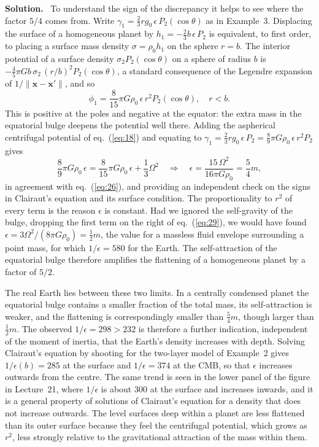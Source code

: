 \documentclass[a4paper,12pt]{paper}
\newenvironment{solution}{\par\noindent\textbf{Solution.}\ }{\par\medskip}
\begin{document}
\begin{solution}
To understand the sign of the discrepancy it helps to see where the factor $5/4$ comes from.
Write $\gamma_{1}=\frac{2}{3}rg_{0}\,\epsilon\,P_{2}(\cos\theta)$ as in Example~3. Displacing the surface of
a homogeneous planet by $h_{1}=-\frac{2}{3}b\,\epsilon\,P_{2}$ is equivalent, to first order, to placing
a surface mass density $\sigma=\rho_{0}h_{1}$ on the sphere $r=b$. The interior potential of a surface
density $\sigma_{2}P_{2}(\cos\theta)$ on a sphere of radius $b$ is
$-\frac{4}{5}\pi Gb\,\sigma_{2}\,(r/b)^{2}P_{2}(\cos\theta)$, a standard consequence of the Legendre
expansion of $1/\|\mathbf{x}-\mathbf{x}'\|$, and so
\begin{equation}
\phi_{1}=\frac{8}{15}\pi G\rho_{0}\,\epsilon\,r^{2}P_{2}(\cos\theta),\quad r<b.
\label{eq:28}
\end{equation}
This is positive at the poles and negative at the equator: the extra mass in the equatorial bulge
deepens the potential well there. Adding the aspherical centrifugal potential of eq.~(\ref{eq:18})
and equating to $\gamma_{1}=\frac{2}{3}rg_{0}\,\epsilon\,P_{2}=\frac{8}{9}\pi G\rho_{0}\,\epsilon\,r^{2}P_{2}$
gives
\begin{equation}
\frac{8}{9}\pi G\rho_{0}\,\epsilon=\frac{8}{15}\pi G\rho_{0}\,\epsilon+\frac{1}{3}\Omega^{2}
\quad\Longrightarrow\quad
\epsilon=\frac{15\,\Omega^{2}}{16\pi G\rho_{0}}=\frac{5}{4}m,
\label{eq:29}
\end{equation}
in agreement with eq.~(\ref{eq:26}), and providing an independent check on the signs in
Clairaut's equation and its surface condition. The proportionality to $r^{2}$ of every term is
the reason $\epsilon$ is constant. Had we ignored the self-gravity of the bulge, dropping the
first term on the right of eq.~(\ref{eq:29}), we would have found
$\epsilon=3\Omega^{2}/(8\pi G\rho_{0})=\frac{1}{2}m$, the value for a massless fluid envelope
surrounding a point mass, for which $1/\epsilon=580$ for the Earth. The self-attraction of the
equatorial bulge therefore amplifies the flattening of a homogeneous planet by a factor of
$5/2$.

The real Earth lies between these two limits. In a centrally condensed planet the equatorial
bulge contains a smaller fraction of the total mass, its self-attraction is weaker, and the
flattening is correspondingly smaller than $\frac{5}{4}m$, though larger than $\frac{1}{2}m$. The
observed $1/\epsilon=298>232$ is therefore a further indication, independent of the moment of
inertia, that the Earth's density increases with depth. Solving Clairaut's equation by shooting for
the two-layer model of Example~2 gives $1/\epsilon(b)=285$ at the surface and $1/\epsilon=374$ at
the CMB, so that $\epsilon$ increases outwards from the centre. The same trend is seen in the
lower panel of the figure in Lecture~21, where $1/\epsilon$ is about $300$ at the surface and
increases inwards, and it is a general property of solutions of Clairaut's equation for a
density that does not increase outwards. The level surfaces deep within a planet are less
flattened than its outer surface because they feel the centrifugal potential, which grows as
$r^{2}$, less strongly relative to the gravitational attraction of the mass within them.
\end{solution}
\end{document}
